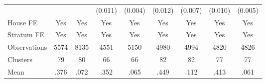 {\begin{tabular}{l*{8}{c}}
                &                  &                  &  (0.011)         &  (0.004)         &  (0.012)         &  (0.007)         &  (0.010)         &  (0.005)         \\
House FE        &      Yes         &      Yes         &      Yes         &      Yes         &      Yes         &      Yes         &      Yes         &      Yes         \\
Stratum FE      &      Yes         &      Yes         &      Yes         &      Yes         &      Yes         &      Yes         &      Yes         &      Yes         \\
\midrule
Observations    &     5574         &     8135         &     4551         &     5150         &     4980         &     4994         &     4820         &     4826         \\
Clusters        &       79         &       80         &       66         &       66         &       82         &       82         &       77         &       77         \\
Mean            &     .376         &     .072         &     .352         &     .065         &     .449         &     .112         &     .413         &     .061         \\
\bottomrule
\end{tabular}
}
